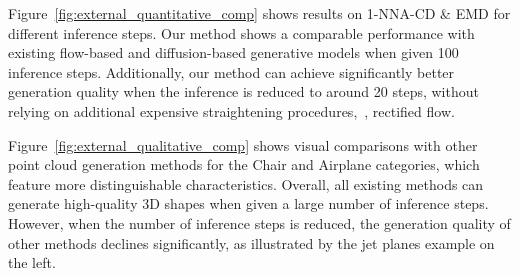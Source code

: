 Figure~\ref{fig:external_quantitative_comp} shows results on 1-NNA-CD \& EMD for different inference steps.
%
Our method shows a comparable performance with existing flow-based and diffusion-based generative models when given 100 inference steps.
%
Additionally, our method can achieve significantly better generation quality when the inference is reduced to around 20 steps, without relying on additional expensive straightening procedures,~\eg, rectified flow.

Figure~\ref{fig:external_qualitative_comp} shows visual comparisons with other point cloud generation methods for the Chair and Airplane categories, which feature more distinguishable characteristics.
%
Overall, all existing methods can generate high-quality 3D shapes when given a large number of inference steps.
%
However, when the number of inference steps is reduced, the generation quality of other methods declines significantly, as illustrated by the jet planes example on the left.
